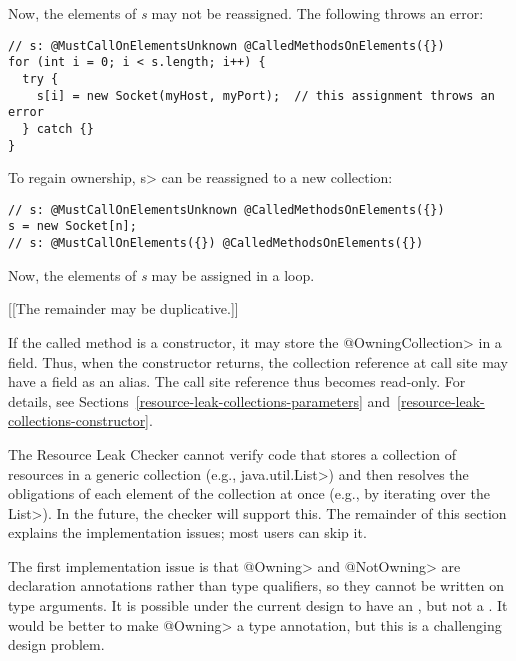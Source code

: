 Now, the elements of \textit{s} may not be reassigned. The following throws an error:

\begin{verbatim}
// s: @MustCallOnElementsUnknown @CalledMethodsOnElements({})
for (int i = 0; i < s.length; i++) {
  try {
    s[i] = new Socket(myHost, myPort);  // this assignment throws an error
  } catch {}
}
\end{verbatim}

To regain ownership, \<s> can be reassigned to a new collection:

\begin{verbatim}
// s: @MustCallOnElementsUnknown @CalledMethodsOnElements({})
s = new Socket[n];
// s: @MustCallOnElements({}) @CalledMethodsOnElements({})
\end{verbatim}

Now, the elements of \textit{s} may be assigned in a loop.


[[The remainder may be duplicative.]]

If the called method is a constructor, it may store the \<@OwningCollection> in
a field. Thus, when the constructor returns, the collection reference at call
site may have a field as an alias. The call site reference thus becomes
read-only. For details, see Sections~\ref{resource-leak-collections-parameters}
and~\ref{resource-leak-collections-constructor}.



The Resource Leak Checker cannot verify code that stores a collection of
resources in a generic collection (e.g., \<java.util.List>) and then
resolves the obligations of each element of the collection at once (e.g.,
by iterating over the \<List>).  In the future, the checker will support
this.  The remainder of this section explains the implementation issues;
most users can skip it.

The first implementation issue is that \<@Owning> and \<@NotOwning> are
declaration annotations rather than type qualifiers, so they cannot be
written on type arguments. It is possible under the current design to have
an , but not a .
It would be better to make \<@Owning> a type annotation, but this is a
challenging design problem.

